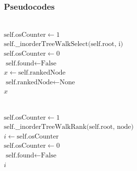 \documentclass[11pt]{article}
\begin{document}
\subsubsection{Pseudocodes}
\begin{algorithm}[H] 
\SetAlgoLined
{}
\vspace{0.5em}
 \\
\vspace{0.5em}
$\text{self.osCounter} \leftarrow 1$\\
$\text{self.\_\_inorderTreeWalkSelect(self.root, i)}$\\
$\text{self.osCounter} \leftarrow 0$\\
$\text{self.found} \leftarrow \text{False}$\\
$x \leftarrow \text{self.rankedNode}$\\
$\text{self.rankedNode} \leftarrow \text{None}$\\
\Return $x$
\end{algorithm}

\vspace{1em}

\begin{algorithm}[H] 
\SetAlgoLined
{}
\vspace{0.5em}
 \\
\vspace{0.5em}
$\text{self.osCounter} \leftarrow 1$\\
$\text{self.\_\_inorderTreeWalkRank(self.root, node)}$\\
$i \leftarrow \text{self.osCounter}$\\
$\text{self.osCounter} \leftarrow 0$\\
$\text{self.found} \leftarrow \text{False}$\\
\Return $i$
\end{algorithm}
\end{document}
